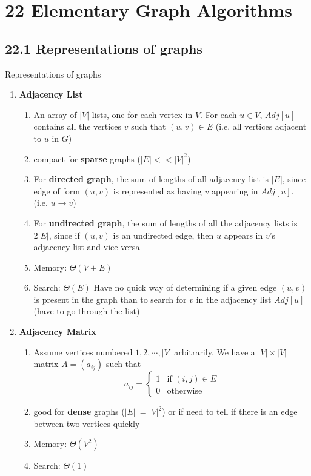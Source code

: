 \documentclass[11pt]{article}
\begin{document}
\section*{22 Elementary Graph Algorithms}


\subsection*{22.1 Representations of graphs}





\begin{defn*}
    Representations of graphs
    \begin{enumerate}
        \item \textbf{Adjacency List} 
        \begin{enumerate}
            \item An array of $|V|$ lists, one for each vertex in $V$. For each $u\in V$, $Adj[u]$ contains all the vertices $v$ such that $(u,v) \in E$ (i.e. all vertices adjacent to $u$ in $G$)
            \item compact for \textbf{sparse} graphs ($|E| << |V|^2$)
            \item For \textbf{directed graph}, the sum of lengths of all adjacency list is $|E|$, since edge of form $(u,v)$ is represented as having $v$ appearing in $Adj[u]$. (i.e. $u \to v$)
            \item For \textbf{undirected graph}, the sum of lengths of all the adjacency lists is $2|E|$, since if $(u,v)$ is an undirected edge, then $u$ appears in $v$'s adjacency list and vice versa 
            \item Memory: $\Theta(V + E)$
            \item Search: $\Theta(E)$ Have no quick way of determining if a given edge $(u,v)$ is present in the graph than to search for $v$ in the adjacency list $Adj[u]$ (have to go through the list)
        \end{enumerate}
        \item \textbf{Adjacency Matrix}
        \begin{enumerate}
            \item Assume vertices numbered $1, 2, \cdots, |V|$ arbitrarily. We have a $|V| \times |V|$ matrix $A = (a_{ij})$ such that 
            \[
                a_{ij} = 
                \begin{cases}
                    1 & \text{if } (i,j)\in E \\
                    0 & \text{otherwise}
                \end{cases}   
            \]
            \item good for \textbf{dense} graphs ($|E| ~= |V|^2$) or if need to tell if there is an edge between two vertices quickly
            \item Memory: $\Theta(V^2)$
            \item Search: $\Theta(1)$
        \end{enumerate}
    \end{enumerate}
\end{defn*}
\end{document}
